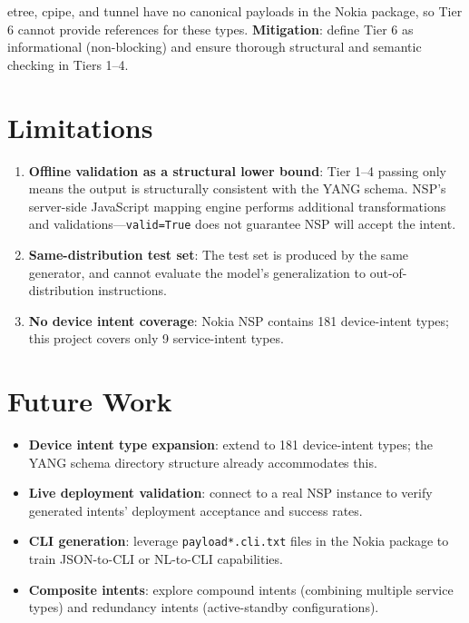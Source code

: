 \documentclass[12pt, a4paper]{article}
\newcommand{\yang}{\textsc{YANG}}
\newcommand{\nsp}{\textsc{NSP}}
\begin{document}
etree, cpipe, and tunnel have no canonical payloads in the Nokia package, so Tier 6 cannot provide references for these types. \textbf{Mitigation}: define Tier 6 as informational (non-blocking) and ensure thorough structural and semantic checking in Tiers 1--4.

\section{Limitations}
\label{sec:limitations}

\begin{enumerate}
  \item \textbf{Offline validation as a structural lower bound}: Tier 1--4 passing only means the output is structurally consistent with the \yang{} schema. \nsp{}'s server-side JavaScript mapping engine performs additional transformations and validations---\texttt{valid=True} does not guarantee \nsp{} will accept the intent.
  \item \textbf{Same-distribution test set}: The test set is produced by the same generator, and cannot evaluate the model's generalization to out-of-distribution instructions.
  \item \textbf{No device intent coverage}: Nokia \nsp{} contains 181 device-intent types; this project covers only 9 service-intent types.
\end{enumerate}

\section{Future Work}

\begin{itemize}
  \item \textbf{Device intent type expansion}: extend to 181 device-intent types; the \yang{} schema directory structure already accommodates this.
  \item \textbf{Live deployment validation}: connect to a real \nsp{} instance to verify generated intents' deployment acceptance and success rates.
  \item \textbf{CLI generation}: leverage \texttt{payload*.cli.txt} files in the Nokia package to train JSON-to-CLI or NL-to-CLI capabilities.
  \item \textbf{Composite intents}: explore compound intents (combining multiple service types) and redundancy intents (active-standby configurations).
\end{itemize}
\end{document}
